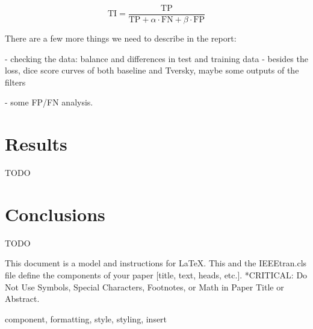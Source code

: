 \documentclass[conference]{IEEEtran}
\begin{document}
\[
\text{TI} = \frac{\text{TP}}{\text{TP} + \alpha \cdot \text{FN} + \beta \cdot \text{FP}}
\]










There are a few more things we need to describe in the report: 

- checking the data: balance and differences in test and training data
- besides the loss, dice score curves of both baseline and Tversky, maybe some outputs of the filters

- some FP/FN analysis.

\section{Results}
TODO
\section{Conclusions}
TODO

This document is a model and instructions for \LaTeX.
This and the IEEEtran.cls file define the components of your paper [title, text, heads, etc.]. *CRITICAL: Do Not Use Symbols, Special Characters, Footnotes, 
or Math in Paper Title or Abstract.

\begin{IEEEkeywords}
component, formatting, style, styling, insert
\end{IEEEkeywords}
\end{document}
